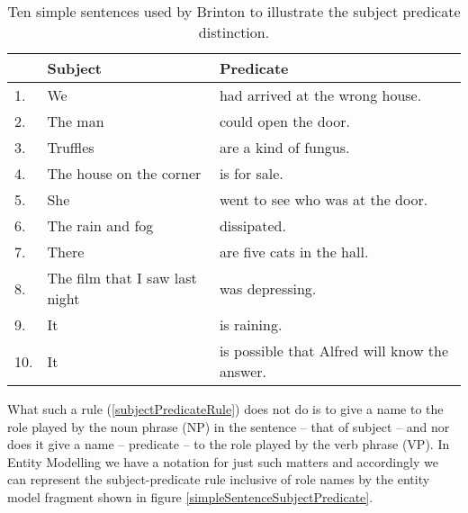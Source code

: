 \begin{center}
\begin{table}
\begin{tabular} {l l l}
	& Subject & Predicate \\
\hline
1. &  We     & had arrived at the wrong house.\\
2. &  The man &  could open the door.\\
3. &  Truffles& are a kind of fungus.\\
4. &  The house on the corner& is for sale.\\
5. &  She& went to see who was at the door.\\
6. &  The rain and fog&  dissipated.\\
7. &  There& are five cats in the hall.\\
8. &  The film that I saw last night& was depressing.\\
9. &  It   & is raining.\\
10. & It   & is possible that Alfred will know the answer.\\
\end{tabular}
\caption{Ten simple sentences used by Brinton to illustrate the subject predicate distinction.}
\label {examplesofsubjectpredicate}
\end{table}
\end{center}

\noindent What such a rule (\ref{subjectPredicateRule}) does not do is to give a name to the role played by the noun phrase (NP) in the sentence -- that of subject -- and nor does it give a name -- predicate -- to the role played by the verb phrase (VP). In Entity Modelling we have a notation for just such matters and accordingly we can represent the subject-predicate rule inclusive of role names by the entity model fragment shown in figure \ref{simpleSentenceSubjectPredicate}.

